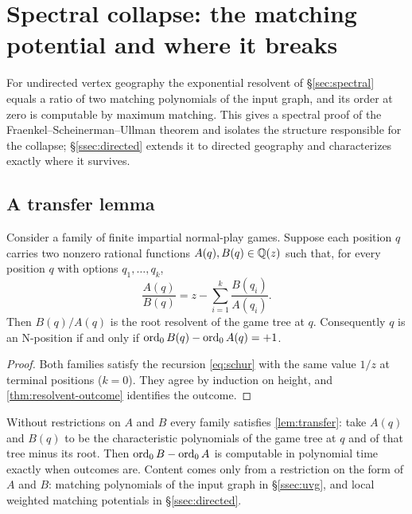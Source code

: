 \section{Spectral collapse: the matching potential and where it breaks}\label{sec:matching}

For undirected vertex geography the exponential resolvent of \S\ref{sec:spectral} equals a ratio of two matching polynomials of the input graph, and its order at zero is computable by maximum matching. This gives a spectral proof of the Fraenkel--Scheinerman--Ullman theorem and isolates the structure responsible for the collapse; \S\ref{ssec:directed} extends it to directed geography and characterizes exactly where it survives.

\subsection{A transfer lemma}
\begin{lemma}[transfer]\label{lem:transfer}
Consider a family of finite impartial normal-play games. Suppose each position $q$ carries two nonzero rational functions $A(q),B(q)\in\mathbb{Q}(z)$ such that, for every position $q$ with options $q_1,\dots,q_k$,
\[
\frac{A(q)}{B(q)}=z-\sum_{i=1}^k\frac{B(q_i)}{A(q_i)}.
\]
Then $B(q)/A(q)$ is the root resolvent of the game tree at $q$. Consequently $q$ is an N-position if and only if $\operatorname{ord}_0B(q)-\operatorname{ord}_0A(q)=+1$.
\end{lemma}
\begin{proof}
Both families satisfy the recursion \eqref{eq:schur} with the same value $1/z$ at terminal positions ($k=0$). They agree by induction on height, and \cref{thm:resolvent-outcome} identifies the outcome.
\end{proof}

\begin{remark*}
Without restrictions on $A$ and $B$ every family satisfies \cref{lem:transfer}: take $A(q)$ and $B(q)$ to be the characteristic polynomials of the game tree at $q$ and of that tree minus its root. Then $\operatorname{ord}_0B-\operatorname{ord}_0A$ is computable in polynomial time exactly when outcomes are. Content comes only from a restriction on the form of $A$ and $B$: matching polynomials of the input graph in \S\ref{ssec:uvg}, and local weighted matching potentials in \S\ref{ssec:directed}.
\end{remark*}


